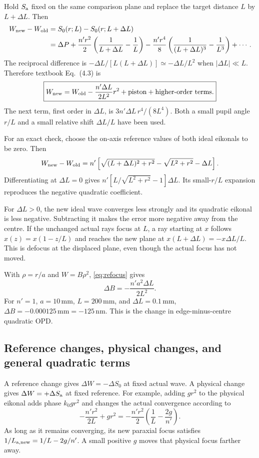 \documentclass[11pt,a4paper]{article}
\numberwithin{equation}{section}
\newcommand{\mm}{\,\mathrm{mm}}
\newcommand{\nm}{\,\mathrm{nm}}
\begin{document}
Hold $S_{\rm a}$ fixed on the same comparison plane and replace the target
distance $L$ by $L+\Delta L$. Then
\begin{align}
 W_{\rm new}-W_{\rm old}
 &=S_0(r;L)-S_0(r;L+\Delta L)\\
 &=\Delta P+\frac{n'r^2}{2}
 \left(\frac1{L+\Delta L}-\frac1L\right)
 -\frac{n'r^4}{8}
 \left(\frac1{(L+\Delta L)^3}-\frac1{L^3}\right)+\cdots.
\end{align}
The reciprocal difference is
$-\Delta L/[L(L+\Delta L)]\simeq-\Delta L/L^2$
when $|\Delta L|\ll L$. Therefore textbook Eq.~(4.3) is
\begin{equation}
 \boxed{
 W_{\rm new}=W_{\rm old}-\frac{n'\Delta L}{2L^2}r^2
 +\text{piston}+\text{higher-order terms}.
 }
 \label{eq:refocus}
\end{equation}
The next term, first order in $\Delta L$, is
$3n'\Delta L\,r^4/(8L^4)$.
Both a small pupil angle $r/L$ and a small relative shift $\Delta L/L$
have been used.

For an exact check, choose the on-axis reference values of both ideal
eikonals to be zero. Then
\[
 W_{\rm new}-W_{\rm old}
 =n'\left[
 \sqrt{(L+\Delta L)^2+r^2}
 -\sqrt{L^2+r^2}-\Delta L
 \right].
\]
Differentiating at $\Delta L=0$ gives
$n'[L/\sqrt{L^2+r^2}-1]\Delta L$.
Its small-$r/L$ expansion reproduces the negative quadratic coefficient.

For $\Delta L>0$, the new ideal wave converges less strongly and its
quadratic eikonal is less negative. Subtracting it makes the error more
negative away from the centre. If the unchanged actual rays focus at $L$,
a ray starting at $x$ follows $x(z)=x(1-z/L)$ and reaches the new plane at
$x(L+\Delta L)=-x\Delta L/L$. This is defocus at the displaced plane,
even though the actual focus has not moved.

With $\rho=r/a$ and $W=B\rho^2$, \eqref{eq:refocus} gives
\begin{equation}
 \boxed{\Delta B=-\frac{n'a^2\Delta L}{2L^2}.}
\end{equation}
For $n'=1$, $a=10\mm$, $L=200\mm$, and $\Delta L=0.1\mm$,
$\Delta B=-0.000125\mm=-125\nm$.
This is the change in edge-minus-centre quadratic OPD.

\subsection{Reference changes, physical changes, and general quadratic terms}
A reference change gives $\Delta W=-\Delta S_0$ at fixed actual wave.
A physical change gives $\Delta W=+\Delta S_{\rm a}$ at fixed reference.
For example, adding $g r^2$ to the physical eikonal adds phase $k_0gr^2$
and changes the actual convergence according to
\[
 -\frac{n'r^2}{2L}+gr^2
 =-\frac{n'r^2}{2}\left(\frac1L-\frac{2g}{n'}\right).
\]
As long as it remains converging, its new paraxial focus satisfies
$1/L_{\rm a,new}=1/L-2g/n'$. A small positive $g$ moves that physical
focus farther away.
\end{document}
